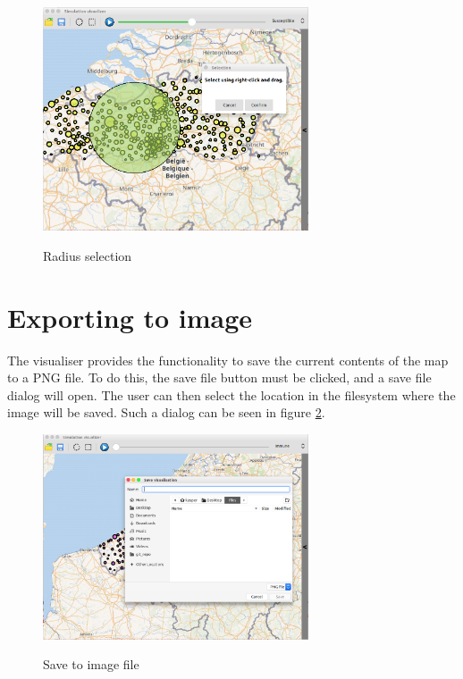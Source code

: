 \begin{figure}[H]
\centering
\includegraphics[width=0.7\textwidth,keepaspectratio]{images/select_rad.png}
\label{fig:screenshot_selectRad}
\caption{Radius selection}
\end{figure}




\section{Exporting to image}
\label{section:export_image}

The visualiser provides the functionality to save the current contents of the map to a PNG file. To do this, the save file button must be clicked, and a save file dialog will open. The user can then select the location in the filesystem where the image will be saved. Such a dialog can be seen in figure \ref{fig:screenshot_saveFile}.

\begin{figure}[H]
\centering
\includegraphics[width=0.7\textwidth,keepaspectratio]{images/save_file.png}
\label{fig:screenshot_saveFile}
\caption{Save to image file}
\end{figure}

